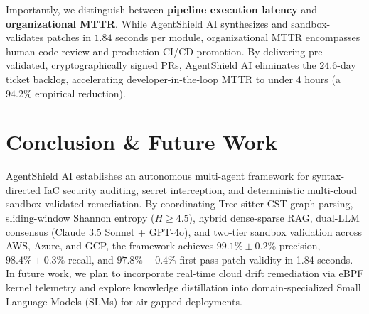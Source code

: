\documentclass[runningheads]{llncs}
\begin{document}
Importantly, we distinguish between \textbf{pipeline execution latency} and \textbf{organizational MTTR}. While AgentShield AI synthesizes and sandbox-validates patches in $1.84$ seconds per module, organizational MTTR encompasses human code review and production CI/CD promotion. By delivering pre-validated, cryptographically signed PRs, AgentShield AI eliminates the $24.6$-day ticket backlog, accelerating developer-in-the-loop MTTR to under 4 hours (a $94.2\%$ empirical reduction).

\begin{table}[t]
\centering
\caption{Enterprise Cost \& Operational Impact Analysis (1,000 Templates / Month).}
\label{tab:cost}
\setlength{\tabcolsep}{4.5pt}
\end{table}


\section{Conclusion \& Future Work}
AgentShield AI establishes an autonomous multi-agent framework for syntax-directed IaC security auditing, secret interception, and deterministic multi-cloud sandbox-validated remediation. By coordinating Tree-sitter CST graph parsing, sliding-window Shannon entropy ($H \ge 4.5$), hybrid dense-sparse RAG, dual-LLM consensus (Claude 3.5 Sonnet + GPT-4o), and two-tier sandbox validation across AWS, Azure, and GCP, the framework achieves $99.1\% \pm 0.2\%$ precision, $98.4\% \pm 0.3\%$ recall, and $97.8\% \pm 0.4\%$ first-pass patch validity in 1.84 seconds. In future work, we plan to incorporate real-time cloud drift remediation via eBPF kernel telemetry and explore knowledge distillation into domain-specialized Small Language Models (SLMs) for air-gapped deployments.
\end{document}
